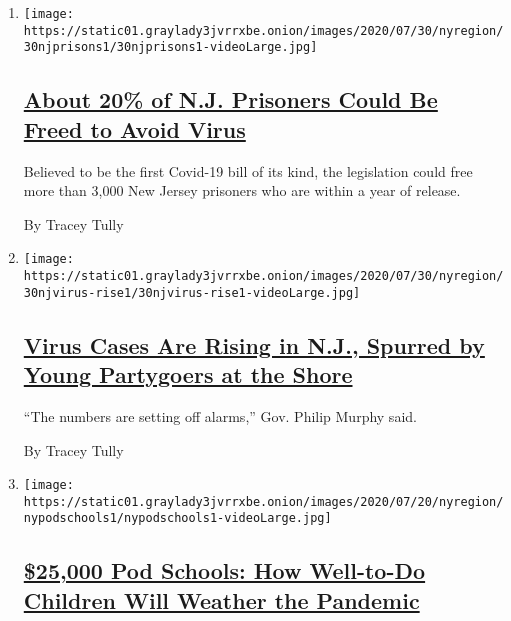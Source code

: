 \begin{enumerate}
\def\labelenumi{\arabic{enumi}.}
\item
  \texttt{[image: https://static01.graylady3jvrrxbe.onion/images/2020/07/30/nyregion/30njprisons1/30njprisons1-videoLarge.jpg]}

  \hypertarget{about-20-of-nj-prisoners-could-be-freed-to-avoid-virus}{%
  \subsection{\texorpdfstring{\href{/2020/07/30/nyregion/New-jersey-inmate-release-Covid.html}{About
  20\% of N.J. Prisoners Could Be Freed to Avoid
  Virus}}{About 20\% of N.J. Prisoners Could Be Freed to Avoid Virus}}\label{about-20-of-nj-prisoners-could-be-freed-to-avoid-virus}}

  Believed to be the first Covid-19 bill of its kind, the legislation
  could free more than 3,000 New Jersey prisoners who are within a year
  of release.

  By Tracey Tully
\item
  \texttt{[image: https://static01.graylady3jvrrxbe.onion/images/2020/07/30/nyregion/30njvirus-rise1/30njvirus-rise1-videoLarge.jpg]}

  \hypertarget{virus-cases-are-rising-in-nj-spurred-by-young-partygoers-at-the-shore}{%
  \subsection{\texorpdfstring{\href{/2020/07/30/nyregion/coronavirus-cases-nj.html}{Virus
  Cases Are Rising in N.J., Spurred by Young Partygoers at the
  Shore}}{Virus Cases Are Rising in N.J., Spurred by Young Partygoers at the Shore}}\label{virus-cases-are-rising-in-nj-spurred-by-young-partygoers-at-the-shore}}

  ``The numbers are setting off alarms,'' Gov. Philip Murphy said.

  By Tracey Tully
\item
  \texttt{[image: https://static01.graylady3jvrrxbe.onion/images/2020/07/20/nyregion/nypodschools1/nypodschools1-videoLarge.jpg]}

  \hypertarget{25000-pod-schools-how-well-to-do-children-will-weather-the-pandemic}{%
  \subsection{\texorpdfstring{\href{/2020/07/30/nyregion/pod-schools-hastings-on-hudson.html}{\$25,000
  Pod Schools: How Well-to-Do Children Will Weather the
  Pandemic}}{\$25,000 Pod Schools: How Well-to-Do Children Will Weather the Pandemic}}\label{25000-pod-schools-how-well-to-do-children-will-weather-the-pandemic}}


\end{enumerate}
